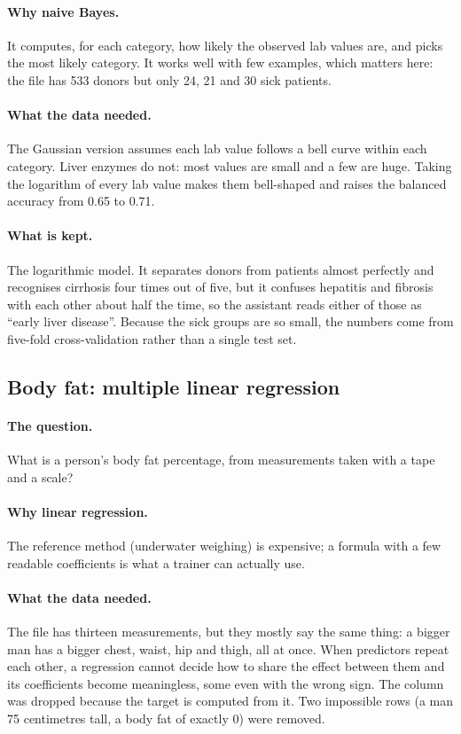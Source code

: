 \paragraph{Why naive Bayes.} It computes, for each category, how likely
the observed lab values are, and picks the most likely category. It works
well with few examples, which matters here: the file has 533 donors but
only 24, 21 and 30 sick patients.

\paragraph{What the data needed.} The Gaussian version assumes each lab
value follows a bell curve within each category. Liver enzymes do not:
most values are small and a few are huge. Taking the logarithm of every
lab value makes them bell-shaped and raises the balanced accuracy from
0.65 to 0.71.

\paragraph{What is kept.} The logarithmic model. It separates donors from
patients almost perfectly and recognises cirrhosis four times out of five,
but it confuses hepatitis and fibrosis with each other about half the
time, so the assistant reads either of those as ``early liver disease''.
Because the sick groups are so small, the numbers come from five-fold
cross-validation rather than a single test set.

\subsection{Body fat: multiple linear regression}

\paragraph{The question.} What is a person's body fat percentage, from
measurements taken with a tape and a scale?

\paragraph{Why linear regression.} The reference method (underwater
weighing) is expensive; a formula with a few readable coefficients is what
a trainer can actually use.

\paragraph{What the data needed.} The file has thirteen measurements, but
they mostly say the same thing: a bigger man has a bigger chest, waist,
hip and thigh, all at once. When predictors repeat each other, a
regression cannot decide how to share the effect between them and its
coefficients become meaningless, some even with the wrong sign. The
 column was dropped because the target is computed from it.
Two impossible rows (a man 75 centimetres tall, a body fat of exactly 0)
were removed.

